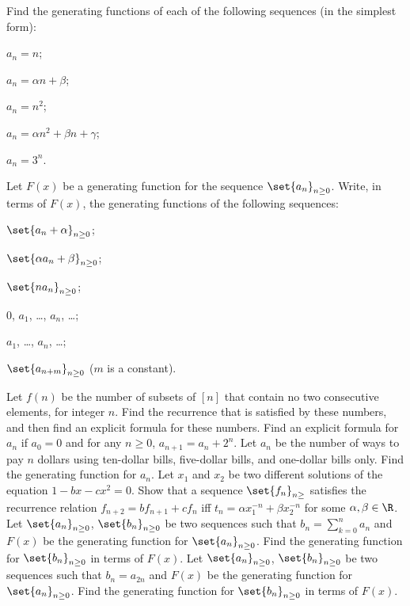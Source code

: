 \begin{chapterendexercises}
  \exercise[recommended] Find the generating functions of each of the following sequences
    (in the simplest form):
    \begin{enumerate}[nolistsep]
      \begin{multicols}{2}
        \item $a_n = n$;
        \item $a_n = \alpha n + \beta$;
        \item $a_n = n^2$;
        \item $a_n = \alpha n^2 + \beta n + \gamma$;
        \item $a_n = 3^n$.
      \end{multicols}
    \end{enumerate}
  \exercise[recommended] Let $F(x)$ be a generating function for the sequence
    $\set{a_n}_{n \ge 0}$. Write, in terms of $F(x)$, the generating functions
    of the following sequences:
    \begin{enumerate}[nolistsep]
      \begin{multicols}{2}
        \item $\set{a_n + \alpha}_{n \ge 0}$;
        \item $\set{\alpha a_n + \beta}_{n \ge 0}$;
        \item $\set{n a_n}_{n \ge 0}$;
        \item $0$, $a_1$, \dots, $a_n$, \dots;
        \item $a_1$, \dots, $a_n$, \dots;
        \item $\set{a_{n + m}}_{n \ge 0}$ ($m$ is a constant).
      \end{multicols}
    \end{enumerate}
  \exercise Let $f(n)$ be the number of subsets of $[n]$ that contain no two
    consecutive elements, for integer $n$. Find the recurrence that is satisfied
    by these numbers, and then find an explicit formula for these numbers.
  \exercise Find an explicit formula for $a_n$ if $a_0 = 0$ and for any
    $n \ge 0$, $a_{n + 1} = a_n + 2^n$.
  \exercise[recommended] Let $a_n$ be the number of ways to pay $n$ dollars using ten-dollar
    bills, five-dollar bills, and one-dollar bills only. Find the generating
    function for $a_n$.
  \exercise[recommended] Let $x_1$ and $x_2$ be two different solutions of the equation
    $1 - bx - cx^2 = 0$. Show that a sequence $\set{f_n}_{n \ge}$ satisfies the
    recurrence relation $f_{n + 2} = b f_{n + 1} + c f_n$ iff
    $t_n = \alpha x_1^{-n} + \beta x_2^{-n}$ for some $\alpha, \beta \in \R$.
  \exercise[recommended] Let $\set{a_n}_{n \ge 0}$, $\set{b_n}_{n \ge 0}$ be two sequences
    such that $b_n = \sum_{k = 0}^n a_n$ and $F(x)$ be the generating function
    for $\set{a_n}_{n \ge 0}$. Find the generating function for
    $\set{b_n}_{n \ge 0}$ in terms of $F(x)$.
  \exercise Let $\set{a_n}_{n \ge 0}$, $\set{b_n}_{n \ge 0}$ be two sequences
    such that $b_n = a_{2n}$ and $F(x)$ be the generating function
    for $\set{a_n}_{n \ge 0}$. Find the generating function for
    $\set{b_n}_{n \ge 0}$ in terms of $F(x)$.
\end{chapterendexercises}
